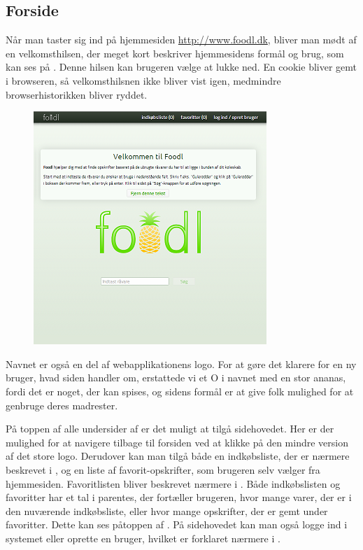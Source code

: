 \subsection{Forside}
\label{subsec:brug-forside}

Når man taster sig ind på hjemmesiden \url{http://www.foodl.dk}, bliver man mødt af en velkomsthilsen, der meget kort beskriver hjemmesidens formål og brug, som kan ses på . Denne hilsen kan brugeren vælge at lukke ned. En cookie bliver gemt i browseren, så velkomsthilsnen ikke bliver vist igen, medmindre browserhistorikken bliver ryddet.

\begin{figure}[H]
	\centering
	\includegraphics[scale=1]{billeder/foodl/thumbnails/forside.png}
	\label{fig:overblik-forside}
\end{figure}

Navnet \Foodl{} er også en del af webapplikationens logo. For at gøre det klarere for en ny bruger, hvad siden handler om, erstattede vi et O i navnet med en stor ananas, fordi det er noget, der kan spises, og sidens formål er at give folk mulighed for at genbruge deres madrester. 

På toppen af alle undersider af \Foodl{} er det muligt at tilgå sidehovedet. Her er der mulighed for at navigere tilbage til forsiden ved at klikke på den mindre version af det store logo. Derudover kan man tilgå både en indkøbsliste, der er nærmere beskrevet i , og en liste af favorit-opskrifter, som brugeren selv vælger fra hjemmesiden. Favoritlisten bliver beskrevet nærmere i . Både indkøbslisten og favoritter har et tal i parentes, der fortæller brugeren, hvor mange varer, der er i den nuværende indkøbsliste, eller hvor mange opskrifter, der er gemt under favoritter. Dette kan ses påtoppen af . På sidehovedet kan man også logge ind i systemet eller oprette en bruger, hvilket er forklaret nærmere i .

